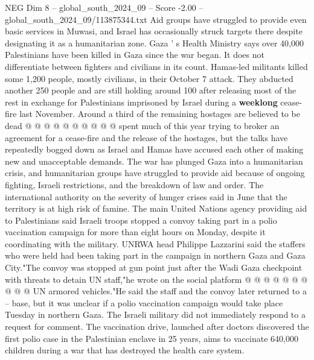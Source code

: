 \begin{textsample}{NEG Dim 8 – global\_south\_2024\_09 – Score -2.00 – global\_south\_2024\_09/113875344.txt}
Aid groups have struggled to provide even basic services in Muwasi, and Israel has occasionally struck targets there despite designating it as a humanitarian zone.
Gaza ' s Health Ministry says over 40,000 Palestinians have been killed in Gaza since the war began.
It does not differentiate between fighters and civilians in its count.
Hamas-led militants killed some 1,200 people, mostly civilians, in their October 7 attack.
They abducted another 250 people and are still holding around 100 after releasing most of the rest in exchange for Palestinians imprisoned by Israel during a \textbf{weeklong} cease-fire last November.
Around a third of the remaining hostages are believed to be dead @ @ @ @ @ @ @ @ @ @ spent much of this year trying to broker an agreement for a cease-fire and the release of the hostages, but the talks have repeatedly bogged down as Israel and Hamas have accused each other of making new and unacceptable demands.
The war has plunged Gaza into a humanitarian crisis, and humanitarian groups have struggled to provide aid because of ongoing fighting, Israeli restrictions, and the breakdown of law and order.
The international authority on the severity of hunger crises said in June that the territory is at high risk of famine.
The main United Nations agency providing aid to Palestinians said Israeli troops stopped a convoy taking part in a polio vaccination campaign for more than eight hours on Monday, despite it coordinating with the military.
UNRWA head Philippe Lazzarini said the staffers who were held had been taking part in the campaign in northern Gaza and Gaza City."The convoy was stopped at gun point just after the Wadi Gaza checkpoint with threats to detain UN staff,"he wrote on the social platform @ @ @ @ @ @ @ @ @ @ UN armored vehicles."He said the staff and the convoy later returned to a -- base, but it was unclear if a polio vaccination campaign would take place Tuesday in northern Gaza.
The Israeli military did not immediately respond to a request for comment.
The vaccination drive, launched after doctors discovered the first polio case in the Palestinian enclave in 25 years, aims to vaccinate 640,000 children during a war that has destroyed the health care system.

\end{textsample}
